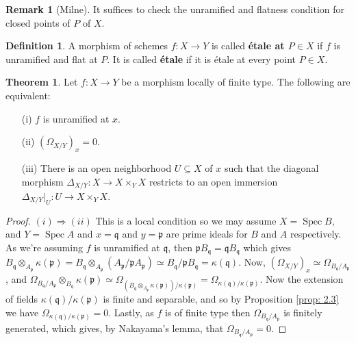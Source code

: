 \documentclass[oneside]{amsart}
\theoremstyle{definition}
\newtheorem{defi}{Definition}[section]
\newtheorem{theorem}{Theorem}[section]
\newtheorem{rem}{Remark}[section]
\DeclareMathOperator{\spec}{Spec}
\begin{document}
\begin{rem}[Milne] It suffices to check the unramified and flatness condition for closed points of $P$ of $X$.
\end{rem}


\begin{defi}
A morphism of schemes $f \colon X \to Y$ is called \textbf{\'etale at $P \in X$} if $f$ is unramified and flat at $P$. It is called \textbf{\'etale} if it is \'etale at every point $P \in X$.
\end{defi}
\begin{theorem} Let $f \colon X \to Y$ be a morphism locally of finite type. The following are equivalent:
\begin{itemize}
	\item [(i)] $f$ is unramified at $x$.
	\item [(ii)] $(\Omega_{X/Y})_x = 0$.
	\item [(iii)] There is an open neighborhood $U \subseteq X$ of $x$ such that the diagonal morphism $\Delta_{X/Y} \colon X \to X \times_Y X $ restricts to an open immersion $\Delta_{X/Y} |_U \colon U \to X \times_Y X$.
\end{itemize}	
\end{theorem} 
\begin{proof} $(i) \Rightarrow (ii)$ This is a local condition so we may assume $X = \spec B$, and $Y = \spec A$ and $x = \mathfrak q $ and $y = \mathfrak p$ are prime ideals for $B$ and $A$ respectively. As we're assuming $f$ is unramified at $\mathfrak q$, then $\mathfrak p B_{\mathfrak q} = \mathfrak q B_{\mathfrak q}$ which gives $B_{\mathfrak q} \otimes_{A_\mathfrak p} \kappa (\mathfrak p) = B_{\mathfrak q} \otimes_{A_\mathfrak p} (A_{\mathfrak p} / \mathfrak p A_{\mathfrak p}) \simeq  B_{\mathfrak q} /\mathfrak p B_{\mathfrak q} = \kappa (\mathfrak q) $. Now, $(\Omega_{X/Y})_x \simeq \Omega_{B_{\mathfrak q} / A_{\mathfrak p}} $, and $\Omega_{B_\mathfrak q/ A_\mathfrak p} \otimes_{B_\mathfrak q} \kappa (\mathfrak p) \simeq \Omega_{( B_\mathfrak q \otimes_{A_\mathfrak p } \kappa (\mathfrak p) ) /\kappa (\mathfrak p)} = \Omega_{\kappa (\mathfrak q)/\kappa (\mathfrak p)}$. Now the extension of fields $\kappa (\mathfrak q)/ \kappa (\mathfrak p)$ is finite and separable, and so by Proposition \ref{prop: 2.3} we have $\Omega_{\kappa (\mathfrak q)/\kappa (\mathfrak p)} = 0$. Lastly, as $f$ is of finite type then $\Omega_{B_\mathfrak q/A_\mathfrak p}$ is finitely generated, which gives, by Nakayama's lemma, that $\Omega_{B_\mathfrak q/ A_\mathfrak p } = 0$. 
\end{proof}
\end{document}
